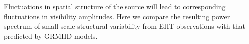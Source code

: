 


Fluctuations in spatial structure of the source will lead to corresponding fluctuations in visibility amplitudes.  Here we compare  the resulting power spectrum of small-scale structural variability from EHT observations with that predicted by GRMHD models.


